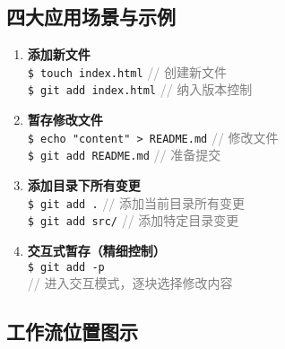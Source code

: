 \subsection{四大应用场景与示例}
\begin{enumerate}[leftmargin=*, nosep]
    \item \textbf{添加新文件} \\
    \texttt{\$ touch index.html} \quad \textcolor{gray}{// 创建新文件} \\
    \texttt{\$ git add index.html} \quad \textcolor{gray}{// 纳入版本控制}
    
    \item \textbf{暂存修改文件} \\
    \texttt{\$ echo "content" > README.md} \quad \textcolor{gray}{// 修改文件} \\
    \texttt{\$ git add README.md} \quad \textcolor{gray}{// 准备提交}
    
    \item \textbf{添加目录下所有变更} \\
    \texttt{\$ git add .} \quad \textcolor{gray}{// 添加当前目录所有变更} \\
    \texttt{\$ git add src/} \quad \textcolor{gray}{// 添加特定目录变更}
    
    \item \textbf{交互式暂存（精细控制）} \\
    \texttt{\$ git add -p} \\
    \textcolor{gray}{// 进入交互模式，逐块选择修改内容}
\end{enumerate}

\subsection{工作流位置图示}
\begin{center}
\end{center}

